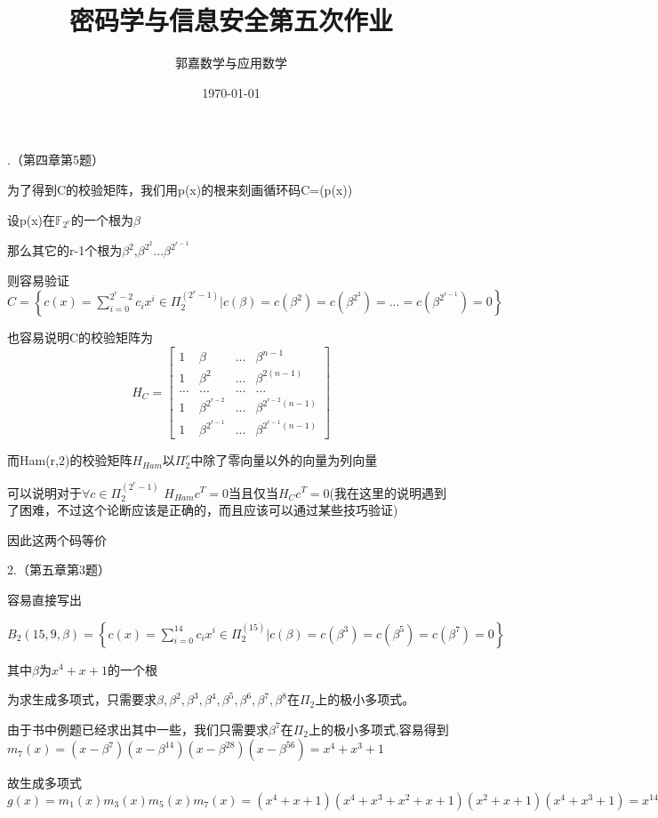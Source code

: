 \documentclass{ctexart}
\title{密码学与信息安全第五次作业}
\author{郭嘉\quad17345019\quad 数学与应用数学}
\date{\today}
\begin{document}
	.（第四章第5题）
	
	为了得到C的校验矩阵，我们用p(x)的根来刻画循环码C=(p(x))
	
	设p(x)在$\mathbb{F}_{2^r}$的一个根为$\beta$
	
	那么其它的r-1个根为$\beta^{2}$,$\beta^{2^2}$...$\beta^{2^{r-1}}$
	
	则容易验证$C=\left\lbrace c(x)=\sum_{i=0}^{2^r-2}c_ix^i \in \Pi_2^{(2^r-1)}|c(\beta)=c(\beta^2)=c(\beta^{2^2})=...=c(\beta^{2^{r-1}})=0 \right\rbrace $
	
	也容易说明C的校验矩阵为$$H_C=
	\begin{bmatrix}
	1 & \beta & ... & \beta^{n-1}\\
	1 & \beta^{2} & ... & \beta^{2(n-1)}\\
	... & ... & ... & ...\\
	1 & \beta^{2^{r-2}} & ... & \beta^{2^{r-2}(n-1)}\\
	1 & \beta^{2^{r-1}} & ... & \beta^{2^{r-1}(n-1)}
	\end{bmatrix} 
	$$
	
	而Ham(r,2)的校验矩阵$H_{Ham}$以$\Pi_2^{r}$中除了零向量以外的向量为列向量

	可以说明对于$\forall c \in \Pi_2^{(2^r-1)}$ $H_{Ham}c^T=0$当且仅当$H_{C}c^T=0$(我在这里的说明遇到了困难，不过这个论断应该是正确的，而且应该可以通过某些技巧验证)
	
	因此这两个码等价
	
	2.（第五章第3题）
	
	容易直接写出
	
	$B_{2}(15,9,\beta)=\left\lbrace c(x)=\sum_{i=0}^{14}c_ix^i \in \Pi_2^{(15)}|c(\beta)=c(\beta^3)=c(\beta^5)=c(\beta^7)=0 \right\rbrace $
	
	其中$\beta$为$x^4+x+1$的一个根
	
	为求生成多项式，只需要求$\beta,\beta^2,\beta^3,\beta^4,\beta^5,\beta^6,\beta^7,\beta^8$在$\Pi_{2}$上的极小多项式。
	
	由于书中例题已经求出其中一些，我们只需要求$\beta^7$在$\Pi_{2}$上的极小多项式,容易得到$m_{7}(x)=(x-\beta^7)(x-\beta^{14})(x-\beta^{28})(x-\beta^{56})=x^4+x^3+1$
	
	故生成多项式$g(x)=m_{1}(x)m_{3}(x)m_{5}(x)m_{7}(x)=(x^4 + x + 1)(x^4 + x^3 + x^2 + x + 1)(x^2 + x + 1)(x^4 + x^3 + 1)=x^{14} + x^{13} + x^{12} + x^{11} + x^{10} + x^9 + x^8 + x^7 + x^6 + x^5 + x^4 + x^3 + x^2 + x + 1$
	
\end{document}
